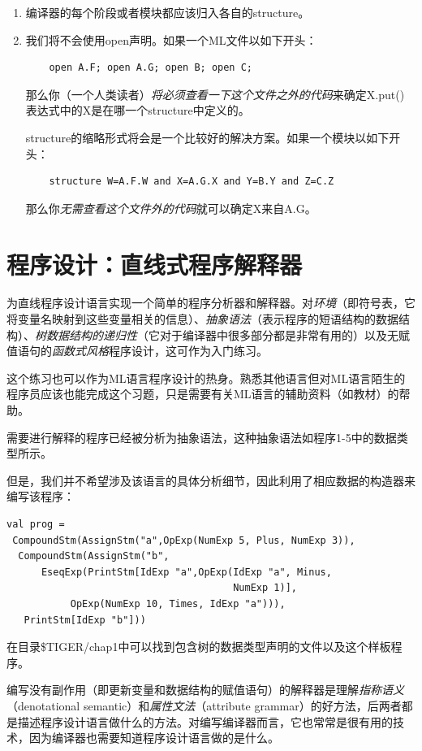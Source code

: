 \documentclass[cn,11pt,chinese]{elegantbook}
\begin{document}
\begin{enumerate}
  \item 编译器的每个阶段或者模块都应该归入各自的structure。
  \item 我们将不会使用open声明。如果一个ML文件以如下开头：
  \begin{verbatim}
    open A.F; open A.G; open B; open C;
  \end{verbatim}
  那么你（一个人类读者）\textit{将必须查看一下这个文件之外的代码}来确定X.put()表达式中的X是在哪一个structure中定义的。

  structure的缩略形式将会是一个比较好的解决方案。如果一个模块以如下开头：
  \begin{verbatim}
    structure W=A.F.W and X=A.G.X and Y=B.Y and Z=C.Z
  \end{verbatim}
  那么你\textit{无需查看这个文件外的代码}就可以确定X来自A.G。
\end{enumerate}

\section{程序设计：直线式程序解释器}

为直线程序设计语言实现一个简单的程序分析器和解释器。对\textit{环境}（即符号表，它将变量名映射到这些变量相关的信息）、\textit{抽象语法}（表示程序的短语结构的数据结构）、\textit{树数据结构的递归性}（它对于编译器中很多部分都是非常有用的）以及无赋值语句的\textit{函数式风格}程序设计，这可作为入门练习。

这个练习也可以作为ML语言程序设计的热身。熟悉其他语言但对ML语言陌生的程序员应该也能完成这个习题，只是需要有关ML语言的辅助资料（如教材）的帮助。

需要进行解释的程序已经被分析为抽象语法，这种抽象语法如程序1-5中的数据类型所示。

但是，我们并不希望涉及该语言的具体分析细节，因此利用了相应数据的构造器来编写该程序：

\begin{verbatim}
val prog =
 CompoundStm(AssignStm("a",OpExp(NumExp 5, Plus, NumExp 3)),
  CompoundStm(AssignStm("b",
      EseqExp(PrintStm[IdExp "a",OpExp(IdExp "a", Minus,
                                       NumExp 1)],
           OpExp(NumExp 10, Times, IdExp "a"))),
   PrintStm[IdExp "b"]))
\end{verbatim}

在目录\$TIGER/chap1中可以找到包含树的数据类型声明的文件以及这个样板程序。

编写没有副作用（即更新变量和数据结构的赋值语句）的解释器是理解\textit{指称语义}（denotational semantic）和\textit{属性文法}（attribute grammar）的好方法，后两者都是描述程序设计语言做什么的方法。对编写编译器而言，它也常常是很有用的技术，因为编译器也需要知道程序设计语言做的是什么。
\end{document}
